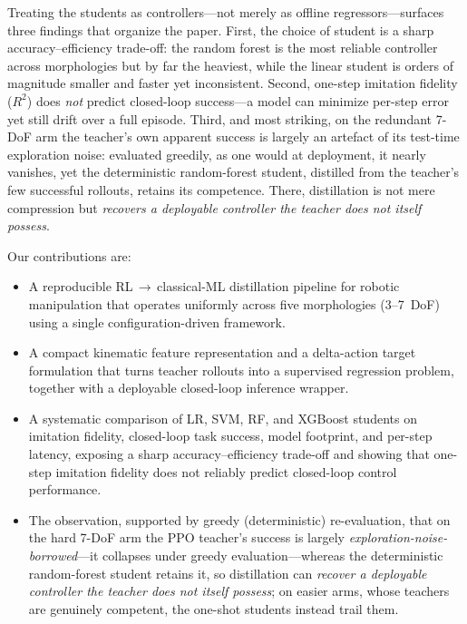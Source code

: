 \documentclass[conference]{IEEEtran}
\begin{document}
Treating the students as controllers---not merely as offline regressors---surfaces
three findings that organize the paper. First, the choice of student is a sharp
accuracy--efficiency trade-off: the random forest is the most reliable controller
across morphologies but by far the heaviest, while the linear student is orders of
magnitude smaller and faster yet inconsistent. Second, one-step imitation fidelity
($R^2$) does \emph{not} predict closed-loop success---a model can minimize
per-step error yet still drift over a full episode. Third, and most striking, on
the redundant 7-DoF arm the teacher's own apparent success is largely an artefact
of its test-time exploration noise: evaluated greedily, as one would at
deployment, it nearly vanishes, yet the deterministic random-forest student,
distilled from the teacher's few successful rollouts, retains its competence.
There, distillation is not mere compression but \emph{recovers a deployable
controller the teacher does not itself possess}.

Our contributions are:
\begin{itemize}
  \item A reproducible RL\,$\rightarrow$\,classical-ML distillation pipeline for
        robotic manipulation that operates uniformly across five morphologies
        (3--7~DoF) using a single configuration-driven framework.
  \item A compact kinematic feature representation and a delta-action target
        formulation that turns teacher rollouts into a supervised regression
        problem, together with a deployable closed-loop inference wrapper.
  \item A systematic comparison of LR, SVM, RF, and XGBoost students on
        imitation fidelity, closed-loop task success, model footprint, and
        per-step latency, exposing a sharp accuracy--efficiency trade-off and
        showing that one-step imitation fidelity does not reliably predict
        closed-loop control performance.
  \item The observation, supported by greedy (deterministic) re-evaluation, that
        on the hard 7-DoF arm the PPO teacher's success is largely
        \emph{exploration-noise-borrowed}---it collapses under greedy
        evaluation---whereas the deterministic random-forest student retains it,
        so distillation can \emph{recover a deployable controller the teacher
        does not itself possess}; on easier arms, whose teachers are genuinely
        competent, the one-shot students instead trail them.
\end{itemize}
\end{document}
